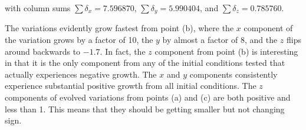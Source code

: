 \documentclass[12pt, letterpaper]{article}
\begin{document}
\vspace{0.6em}

with column sums $\sum{\delta_x} = 7.596870$, $\sum{\delta_y} = 5.990404$, and
$\sum{\delta_z} = 0.785760$. 

\vspace{1em}

The variations evidently grow fastest from point (b), where the $x$ component 
of the variation grows by a factor of 10, the $y$ by almost a factor of 8, and
the $z$ flips around backwards to $-1.7$. In fact, the $z$ component from point
(b) is interesting in that it is the only component from any of the initial
conditions tested that actually experiences negative growth. The $x$ and $y$ 
components consistently experience substantial positive growth from all initial
conditions. The $z$ components of evolved variations from points (a) and (c) are
both positive and less than 1. This means that they should be getting smaller 
but not changing sign.
\end{document}
